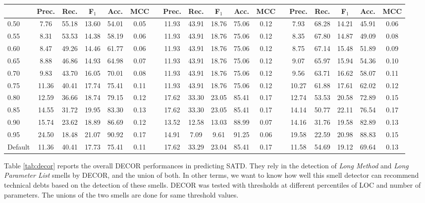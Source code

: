 \begin{landscape}
\begin{table*}[t]
\begin{adjustbox}{center}
\begin{tabular}{lccccclccccclccccc}
				\cline{2-18}
				& Prec. & Rec. & F$_1$ & Acc. & MCC &  & Prec. & Rec. & F$_1$ & Acc. & MCC &  & Prec. & Rec. & F$_1$ & Acc. & MCC\\
				\hline
				0.50 & 7.76 & 55.18 & 13.60 & 54.01 & 0.05 &  & 11.93 & 43.91 & 18.76 & 75.06 & 0.12 &  & 7.93 & 68.28 & 14.21 & 45.91 & 0.06\\
				0.55 & 8.31 & 53.53 & 14.38 & 58.19 & 0.06 &  & 11.93 & 43.91 & 18.76 & 75.06 & 0.12 &  & 8.35 & 67.80 & 14.87 & 49.09 & 0.08\\
				0.60 & 8.47 & 49.26 & 14.46 & 61.77 & 0.06 &  & 11.93 & 43.91 & 18.76 & 75.06 & 0.12 &  & 8.75 & 67.14 & 15.48 & 51.89 & 0.09\\
				0.65 & 8.88 & 46.86 & 14.93 & 64.98 & 0.07 &  & 11.93 & 43.91 & 18.76 & 75.06 & 0.12 &  & 9.07 & 65.97 & 15.94 & 54.36 & 0.10\\
				0.70 & 9.83 & 43.70 & 16.05 & 70.01 & 0.08 &  & 11.93 & 43.91 & 18.76 & 75.06 & 0.12 &  & 9.56 & 63.71 & 16.62 & 58.07 & 0.11\\
				0.75 & 11.36 & 40.41 & 17.74 & 75.41 & 0.11 &  & 11.93 & 43.91 & 18.76 & 75.06 & 0.12 &  & 10.27 & 61.88 & 17.61 & 62.02 & 0.12\\
				0.80 & 12.59 & 36.66 & 18.74 & 79.15 & 0.12 &  & 17.62 & 33.30 & 23.05 & 85.41 & 0.17 &  & 12.74 & 53.53 & 20.58 & 72.89 & 0.15\\
				0.85 & 14.55 & 31.72 & 19.95 & 83.30 & 0.13 &  & 17.62 & 33.30 & 23.05 & 85.41 & 0.17 &  & 14.14 & 50.77 & 22.11 & 76.54 & 0.17\\
				0.90 & 15.74 & 23.62 & 18.89 & 86.69 & 0.12 &  & 13.52 & 12.58 & 13.03 & 88.99 & 0.07 &  & 14.16 & 31.76 & 19.58 & 82.89 & 0.13\\
				0.95 & 24.50 & 18.48 & 21.07 & 90.92 & 0.17 &  & 14.91 & 7.09 & 9.61 & 91.25 & 0.06 &  & 19.58 & 22.59 & 20.98 & 88.83 & 0.15\\
				\hline
				Default & 11.36 & 40.41 & 17.73 & 75.41 & 0.11 & &  17.62 & 33.29 & 23.04 & 85.41 & 0.17 & & 11.58 & 54.69 & 19.12 & 69.64 & 0.13\\
				\hline
			\end{tabular}
		\end{adjustbox}
	\vspace{-3mm}
\end{table*}
\end{landscape}

Table \ref{tab:decor} reports the overall DECOR performances in predicting SATD. They rely in the detection of \textit{Long Method} and \textit{Long Parameter List} smells by DECOR, and the union of both. In other terms, we want to know how well this smell detector can recommend technical debts based on the detection of these smells. DECOR was tested with thresholds at different percentiles of LOC and number of parameters. The unions of the two smells are done for same threshold values.

